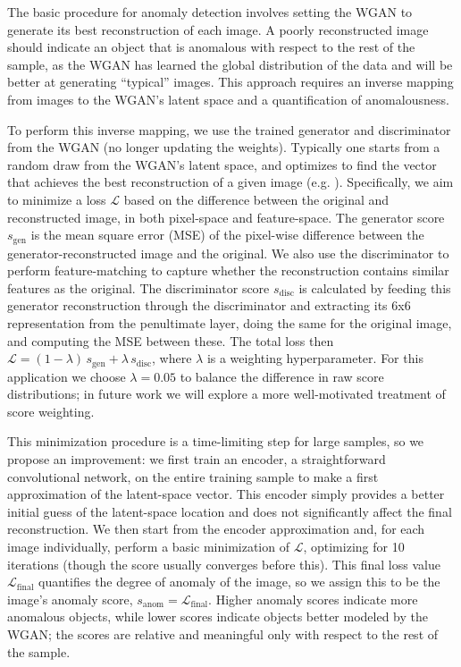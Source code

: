 \documentclass[fleqn,usenatbib,useAMS]{mnras}
\begin{document}
The basic procedure for anomaly detection involves setting the WGAN to generate its best reconstruction of each image.
A poorly reconstructed image should indicate an object that is anomalous with respect to the rest of the sample, as the WGAN has learned the global distribution of the data and will be better at generating ``typical'' images.
This approach requires an inverse mapping from images to the WGAN's latent space and a quantification of anomalousness.

To perform this inverse mapping, we use the trained generator and discriminator from the WGAN (no longer updating the weights).
Typically one starts from a random draw from the WGAN's latent space, and optimizes to find the vector that achieves the best reconstruction of a given image (e.g. \citealt{Schlegl2017}).
Specifically, we aim to minimize a loss $\mathcal{L}$ based on the difference between the original and reconstructed image, in both pixel-space and feature-space.
The generator score $s_\mathrm{gen}$ is the mean square error (MSE) of the pixel-wise difference between the generator-reconstructed image and the original.
We also use the discriminator to perform feature-matching to capture whether the reconstruction contains similar features as the original.
The discriminator score $s_\mathrm{disc}$ is calculated by feeding this generator reconstruction through the discriminator and extracting its 6x6 representation from the penultimate layer, doing the same for the original image, and computing the MSE between these.
The total loss then $\mathcal{L} = (1-\lambda) \, s_\mathrm{gen} + \lambda \, s_\mathrm{disc}$, where $\lambda$ is a weighting hyperparameter.
For this application we choose $\lambda=0.05$ to balance the difference in raw score distributions; in future work we will explore a more well-motivated treatment of score weighting.

This minimization procedure is a time-limiting step for large samples, so we propose an improvement: we first train an encoder, a straightforward convolutional network, on the entire training sample to make a first approximation of the latent-space vector.
This encoder simply provides a better initial guess of the latent-space location and does not significantly affect the final reconstruction.
We then start from the encoder approximation and, for each image individually, perform a basic minimization of $\mathcal{L}$, optimizing for 10 iterations (though the score usually converges before this).
This final loss value $\mathcal{L}_\mathrm{final}$ quantifies the degree of anomaly of the image, so we assign this to be the image's anomaly score, $s_\mathrm{anom} = \mathcal{L}_\mathrm{final}$. 
Higher anomaly scores indicate more anomalous objects, while lower scores indicate objects better modeled by the WGAN; the scores are relative and meaningful only with respect to the rest of the sample.
\end{document}
